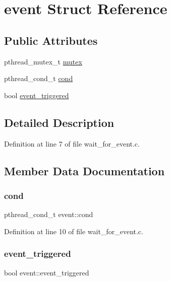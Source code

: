 \hypertarget{structevent}{}\section{event Struct Reference}
\label{structevent}
\subsection*{Public Attributes}
\begin{DoxyCompactItemize}
\item 
pthread\+\_\+mutex\+\_\+t \hyperlink{structevent_a2f6413c912a397ad2ca600e012f97a52}{mutex}
\item 
pthread\+\_\+cond\+\_\+t \hyperlink{structevent_ade6197c565083764ad188de47a92d590}{cond}
\item 
bool \hyperlink{structevent_add27fbbf1d4a5911a94a5cad433a8e7f}{event\+\_\+triggered}
\end{DoxyCompactItemize}


\subsection{Detailed Description}


Definition at line 7 of file wait\+\_\+for\+\_\+event.\+c.



\subsection{Member Data Documentation}
\mbox{\label{structevent_ade6197c565083764ad188de47a92d590}} 
\subsubsection{\texorpdfstring{cond}{cond}}
{\footnotesize\ttfamily pthread\+\_\+cond\+\_\+t event\+::cond}



Definition at line 10 of file wait\+\_\+for\+\_\+event.\+c.

\mbox{\label{structevent_add27fbbf1d4a5911a94a5cad433a8e7f}} 
\subsubsection{\texorpdfstring{event\+\_\+triggered}{event\_triggered}}
{\footnotesize\ttfamily bool event\+::event\+\_\+triggered}



